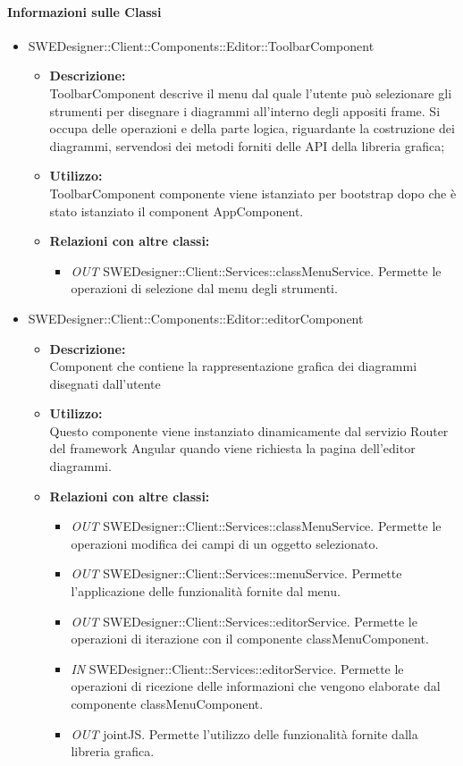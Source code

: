 		\paragraph{Informazioni sulle Classi}
		\begin{itemize}
			\item SWEDesigner::Client::Components::Editor::ToolbarComponent
			\begin{itemize}
				\item \textbf{Descrizione: }\\
				ToolbarComponent descrive il menu dal quale l'utente può selezionare gli
				strumenti per disegnare i diagrammi all'interno degli appositi frame. Si
				occupa delle operazioni e della parte logica, riguardante la costruzione
				dei diagrammi, servendosi dei metodi forniti delle API della libreria grafica;
				\item \textbf{Utilizzo: }\\
				ToolbarComponent componente viene istanziato per bootstrap dopo che è stato
				istanziato il component AppComponent.
				\item \textbf{Relazioni con altre classi: }
				\begin{itemize}
				\item \emph{OUT} SWEDesigner::Client::Services::classMenuService. Permette le operazioni di selezione dal menu degli strumenti.
				\end{itemize}
			\end{itemize}
			\item SWEDesigner::Client::Components::Editor::editorComponent
			\begin{itemize}
				\item \textbf{Descrizione: }\\
				Component che contiene la rappresentazione grafica dei diagrammi disegnati dall'utente
				\item \textbf{Utilizzo: }\\
				Questo componente viene instanziato dinamicamente dal servizio Router del
				framework Angular quando viene richiesta la pagina dell'editor diagrammi.
				\item \textbf{Relazioni con altre classi: }
				\begin{itemize}
				\item \emph{OUT} SWEDesigner::Client::Services::classMenuService. Permette le operazioni modifica dei campi di un oggetto selezionato.
				\item \emph{OUT} SWEDesigner::Client::Services::menuService. Permette l'applicazione delle funzionalità fornite dal menu.
				\item \emph{OUT} SWEDesigner::Client::Services::editorService. Permette le operazioni di iterazione con il componente classMenuComponent.
				\item \emph{IN} SWEDesigner::Client::Services::editorService. Permette le operazioni di ricezione delle informazioni che vengono elaborate dal componente classMenuComponent.
				\item \emph{OUT} jointJS. Permette l'utilizzo delle funzionalità fornite dalla libreria grafica.
				\end{itemize}
			\end{itemize}
			

\end{itemize}
